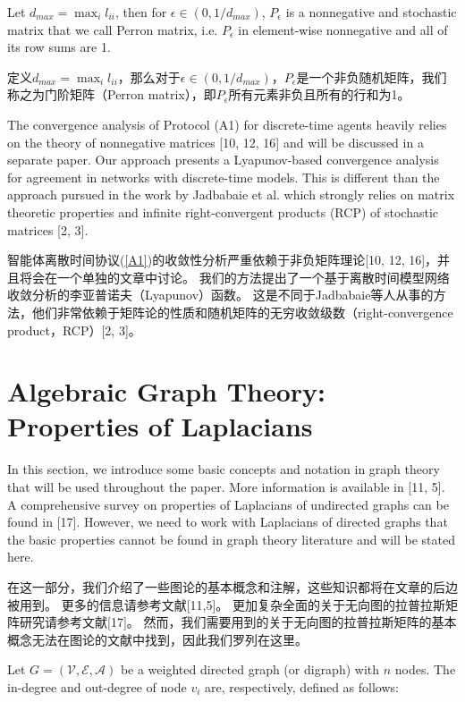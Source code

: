 \documentclass{article}
\begin{document}
\noindent Let $d_{max} = \max_il_{ii}$, then for $\epsilon\in (0,1/d_{max})$, $P_\epsilon$ is a nonnegative and stochastic matrix that we call Perron matrix, i.e. $P_\epsilon$ in element-wise nonnegative and all of its row sums are 1.

\noindent 定义$d_{max} = \max_il_{ii}$，那么对于$\epsilon\in (0,1/d_{max})$，$P_\epsilon$是一个非负随机矩阵，我们称之为门阶矩阵（Perron matrix），即$P_\epsilon$所有元素非负且所有的行和为1。

{\color[gray]{0.5}
The convergence analysis of Protocol (A1) for discrete-time agents heavily relies on the theory of nonnegative matrices [10, 12, 16] and will be discussed in a separate paper. 
Our approach presents a Lyapunov-based convergence analysis for agreement in networks with discrete-time models. 
This is diﬀerent than the approach pursued in the work by Jadbabaie et al. which strongly relies on matrix theoretic properties and inﬁnite right-convergent products (RCP) of stochastic matrices [2, 3].
}

智能体离散时间协议(\ref{A1})的收敛性分析严重依赖于非负矩阵理论[10, 12, 16]，并且将会在一个单独的文章中讨论。
我们的方法提出了一个基于离散时间模型网络收敛分析的李亚普诺夫（Lyapunov）函数。
这是不同于Jadbabaie等人从事的方法，他们非常依赖于矩阵论的性质和随机矩阵的无穷收敛级数（right-convergence product，RCP）[2, 3]。

\section{Algebraic Graph Theory: Properties of Laplacians}
{\color[gray]{0.5}
\noindent In this section, we introduce some basic concepts and notation in graph theory that will be used throughout the paper. 
More information is available in [11, 5]. 
A comprehensive survey on properties of Laplacians of undirected graphs can be found in [17]. 
However, we need to work with Laplacians of directed graphs that the basic properties cannot be found in graph theory literature and will be stated here.
}

\noindent 在这一部分，我们介绍了一些图论的基本概念和注解，这些知识都将在文章的后边被用到。
更多的信息请参考文献[11,5]。
更加复杂全面的关于无向图的拉普拉斯矩阵研究请参考文献[17]。
然而，我们需要用到的关于无向图的拉普拉斯矩阵的基本概念无法在图论的文献中找到，因此我们罗列在这里。

{\color[gray]{0.5}
Let $G=(\mathcal{V}, \mathcal{E}, \mathcal{A})$ be a weighted directed graph (or digraph) with $n$ nodes. 
The in-degree and out-degree of node $v_i$ are, respectively, deﬁned as follows:
}
\end{document}
